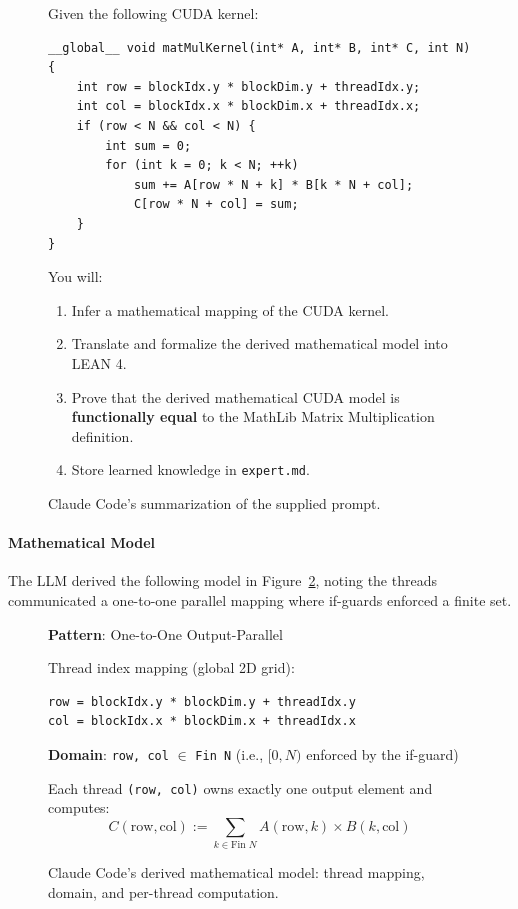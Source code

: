 \documentclass{article}
\begin{document}
\begin{figure}[H]
\begin{promptbox}
Given the following CUDA kernel:

\begin{verbatim}
__global__ void matMulKernel(int* A, int* B, int* C, int N) {
    int row = blockIdx.y * blockDim.y + threadIdx.y;
    int col = blockIdx.x * blockDim.x + threadIdx.x;
    if (row < N && col < N) {
        int sum = 0;
        for (int k = 0; k < N; ++k)
            sum += A[row * N + k] * B[k * N + col];
            C[row * N + col] = sum;
    }
}
\end{verbatim}

You will:
\begin{enumerate}
    \item Infer a mathematical mapping of the CUDA kernel.
    \item Translate and formalize the derived mathematical model into LEAN 4.
    \item Prove that the derived mathematical CUDA model is \textbf{functionally equal} to the MathLib Matrix Multiplication definition.
    \item Store learned knowledge in \texttt{expert.md}.
\end{enumerate}
\end{promptbox}
\caption{Claude Code's summarization of the supplied prompt.}
\label{fig:lean-prompt-summary}
\end{figure}

\paragraph{Mathematical Model}

The LLM derived the following model in Figure~\ref{fig:lean-math-model}, noting the threads communicated a one-to-one parallel mapping where if-guards enforced a finite set.

\begin{figure}[H]
\begin{promptbox}
\textbf{Pattern}: One-to-One Output-Parallel

\medskip
Thread index mapping (global 2D grid):
\begin{verbatim}
row = blockIdx.y * blockDim.y + threadIdx.y
col = blockIdx.x * blockDim.x + threadIdx.x
\end{verbatim}

\medskip
\textbf{Domain}: \texttt{row, col} $\in$ \texttt{Fin N} (i.e., $[0, N)$ enforced by the if-guard)

\medskip
Each thread \texttt{(row, col)} owns exactly one output element and computes:
$$C(\text{row}, \text{col}) := \sum_{k \in \text{Fin } N} A(\text{row}, k) \times B(k, \text{col})$$
\end{promptbox}
\caption{Claude Code's derived mathematical model: thread mapping, domain, and per-thread computation.}
\label{fig:lean-math-model}
\end{figure}
\end{document}
